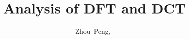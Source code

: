 \documentclass[journal,comsoc]{IEEEtran}
\begin{document}
%
\title{Analysis of DFT and DCT}
%
%
%

\author{Zhou~Peng,~}

% 
%



% 
\end{document}
